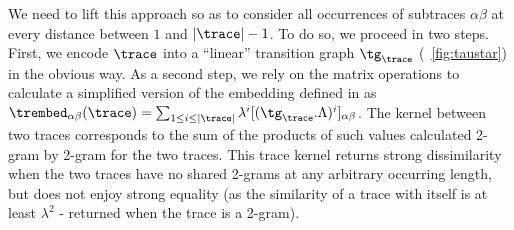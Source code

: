 We need to lift this approach so as to consider all occurrences of subtraces $\alpha\beta$ at every distance between $1$ and $|\trace|-1$. To do so, we proceed in two steps. First, we encode $\trace$ into a ``linear'' transition graph $\tg_\trace$ (\figurename~\ref{fig:taustar}) in the obvious way. %
As a second step, we rely on the matrix operations to calculate a simplified version of the embedding defined in \cite{LodhiSSCW02} as $\trembed_{\alpha\beta}(\trace)=\sum_{1\leq i\leq |\trace|}\lambda^i[(\tg_{\trace}.\Lambda)^i]_{\alpha\beta}$. %
The kernel between two traces corresponds to the sum of the products of such values calculated 2-gram by 2-gram for the two traces.
This trace kernel returns strong dissimilarity when the two traces have no shared 2-grams at any arbitrary occurring length, but does not enjoy strong equality (as the similarity of a trace with itself is at least $\lambda^2$ - returned when the trace is a 2-gram).

%

